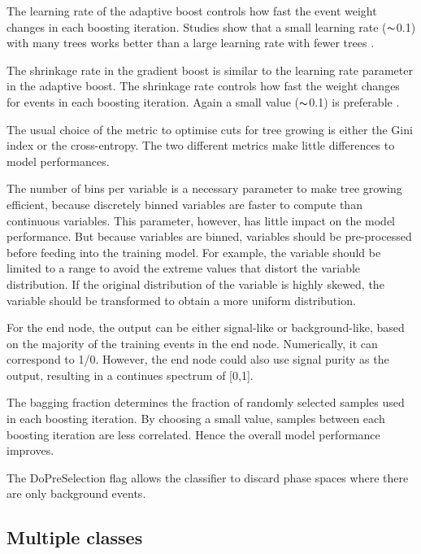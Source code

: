 The learning rate of the adaptive boost  controls how fast the event weight changes in each boosting iteration. Studies show that a small learning rate ($\thicksim$0.1) with many trees works better than a large learning rate with fewer trees \cite{hastie2009elements}.

The shrinkage rate in the gradient boost is similar to the learning rate parameter in the adaptive boost. The shrinkage rate controls how fast the weight changes for events in each boosting iteration. Again a small value   ($\thicksim$0.1) is preferable \cite{hastie2009elements}.

The usual choice of the metric to optimise cuts for tree growing is either the Gini index or the cross-entropy. The two different metrics make  little differences to model performances.



The number of bins per variable is  a necessary parameter to make tree growing efficient, because discretely binned variables are faster to compute than continuous variables. This parameter, however,  has little  impact on the model performance. But because variables are binned, variables should be pre-processed before feeding into the training model. For example, the variable should be limited to a range to avoid the extreme values that distort the variable distribution. If the original distribution of the variable is highly skewed, the variable should be transformed to obtain a more uniform distribution.

For the end node, the output can be either signal-like or background-like, based on the majority of the training events in the end node. Numerically, it can correspond to 1/0. However, the end node could also use signal purity as the output, resulting in a continues spectrum of [0,1].

The bagging fraction determines the fraction of randomly selected samples used in each boosting iteration. By choosing a small value, samples between each boosting iteration are less correlated. Hence the overall model performance improves.

The DoPreSelection flag allows the classifier to discard phase spaces where there are only background events.

\subsection{Multiple classes}
\label{sec:pandoraMVAmulticlass}

